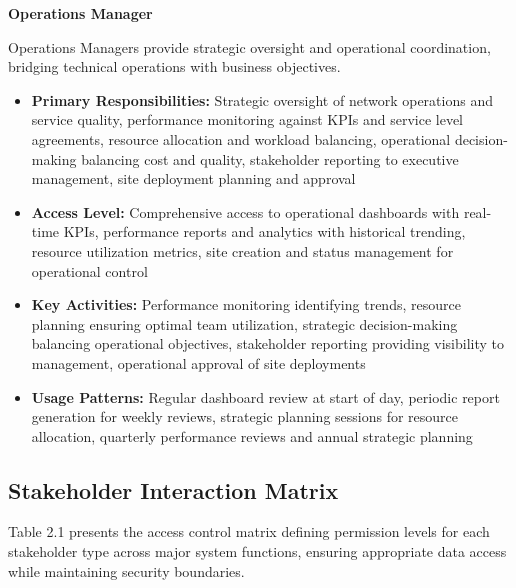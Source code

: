 \textbf{Operations Manager}

Operations Managers provide strategic oversight and operational coordination, bridging technical operations with business objectives.

\begin{itemize}
\item \textbf{Primary Responsibilities:} Strategic oversight of network operations and service quality, performance monitoring against KPIs and service level agreements, resource allocation and workload balancing, operational decision-making balancing cost and quality, stakeholder reporting to executive management, site deployment planning and approval
\item \textbf{Access Level:} Comprehensive access to operational dashboards with real-time KPIs, performance reports and analytics with historical trending, resource utilization metrics, site creation and status management for operational control
\item \textbf{Key Activities:} Performance monitoring identifying trends, resource planning ensuring optimal team utilization, strategic decision-making balancing operational objectives, stakeholder reporting providing visibility to management, operational approval of site deployments
\item \textbf{Usage Patterns:} Regular dashboard review at start of day, periodic report generation for weekly reviews, strategic planning sessions for resource allocation, quarterly performance reviews and annual strategic planning
\end{itemize}

\subsection{Stakeholder Interaction Matrix}

Table 2.1 presents the access control matrix defining permission levels for each stakeholder type across major system functions, ensuring appropriate data access while maintaining security boundaries.

